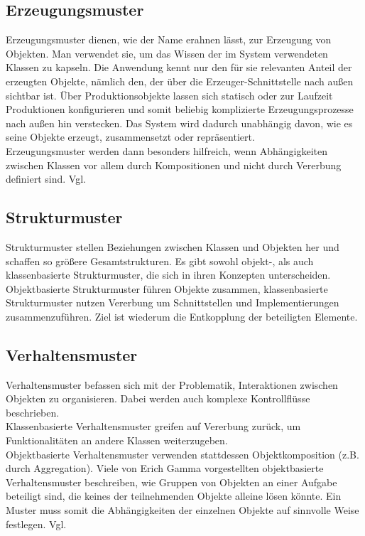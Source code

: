\documentclass[fontsize=11pt,a4paper,final]{scrreprt}[2003/01/01]
\begin{document}
\subsection{Erzeugungsmuster}\label{se:Erzeugungsmuster}

Erzeugungsmuster dienen, wie der Name erahnen lässt, zur Erzeugung von Objekten. Man verwendet sie, um das Wissen der im System verwendeten Klassen zu kapseln. Die Anwendung kennt nur den für sie relevanten Anteil der erzeugten Objekte, nämlich den, der über die Erzeuger-Schnittstelle nach außen sichtbar ist. Über Produktionsobjekte lassen sich statisch oder zur Laufzeit Produktionen konfigurieren und somit beliebig komplizierte Erzeugungsprozesse nach außen hin verstecken. Das System wird dadurch unabhängig davon, wie es seine Objekte erzeugt, zusammensetzt oder repräsentiert. 
\\
Erzeugungsmuster werden dann besonders hilfreich, wenn Abhängigkeiten zwischen Klassen vor allem durch Kompositionen und nicht durch Vererbung definiert sind. Vgl. \cite[S. 101]{gamma2004}

\subsection{Strukturmuster}\label{se:Strukturmuster}

Strukturmuster stellen Beziehungen zwischen Klassen und Objekten her und schaffen so größere Gesamtstrukturen. Es gibt sowohl objekt-, als auch klassenbasierte Strukturmuster, die sich in ihren Konzepten unterscheiden. Objektbasierte Strukturmuster führen Objekte zusammen, klassenbasierte Strukturmuster nutzen Vererbung um Schnittstellen und Implementierungen zusammenzuführen. Ziel ist wiederum die Entkopplung der beteiligten Elemente.

\subsection{Verhaltensmuster}\label{se:Verhaltensmuster}

Verhaltensmuster befassen sich mit der Problematik, Interaktionen zwischen Objekten zu organisieren. Dabei werden auch komplexe Kontrollflüsse beschrieben. \\
Klassenbasierte Verhaltensmuster greifen auf Vererbung zurück, um Funktionalitäten an andere Klassen weiterzugeben. \\
Objektbasierte Verhaltensmuster verwenden stattdessen Objektkomposition (z.B. durch Aggregation). Viele von Erich Gamma vorgestellten objektbasierte Verhaltensmuster beschreiben, wie Gruppen von Objekten an einer Aufgabe beteiligt sind, die keines der teilnehmenden Objekte alleine lösen könnte. Ein Muster muss somit die Abhängigkeiten der einzelnen Objekte auf sinnvolle Weise festlegen. Vgl. \cite[S. 271]{gamma2004}
\end{document}
